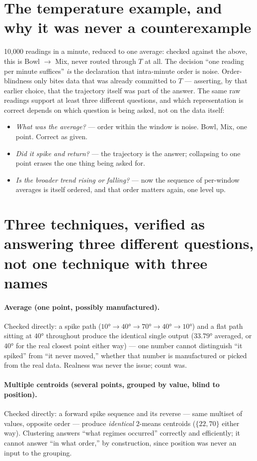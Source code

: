 \documentclass[11pt]{article}
\begin{document}
\section{The temperature example, and why it was never a
counterexample}

10,000 readings in a minute, reduced to one average: checked against
the above, this is Bowl $\to$ Mix, never routed through $T$ at all.
The decision ``one reading per minute suffices'' \emph{is} the
declaration that intra-minute order is noise. Order-blindness only
bites data that was already committed to $T$ --- asserting, by that
earlier choice, that the trajectory itself was part of the answer.
The same raw readings support at least three different questions,
and which representation is correct depends on which question is
being asked, not on the data itself:
\begin{itemize}
\item \emph{What was the average?} --- order within the window is
noise. Bowl, Mix, one point. Correct as given.
\item \emph{Did it spike and return?} --- the trajectory is the
answer; collapsing to one point erases the one thing being asked
for.
\item \emph{Is the broader trend rising or falling?} --- now the
sequence of per-window averages is itself ordered, and that order
matters again, one level up.
\end{itemize}

\section{Three techniques, verified as answering three different
questions, not one technique with three names}

\paragraph{Average (one point, possibly manufactured).} Checked
directly: a spike path ($10°\!\to\!40°\!\to\!70°\!\to\!40°\!\to\!10°$)
and a flat path sitting at $40°$ throughout produce the identical
single output ($33.79°$ averaged, or $40°$ for the real closest
point either way) --- one number cannot distinguish ``it spiked''
from ``it never moved,'' whether that number is manufactured or
picked from the real data. Realness was never the issue; count was.

\paragraph{Multiple centroids (several points, grouped by value,
blind to position).} Checked directly: a forward spike sequence and
its reverse --- same multiset of values, opposite order --- produce
\emph{identical} $2$-means centroids ($\{22,70\}$ either way).
Clustering answers ``what regimes occurred'' correctly and
efficiently; it cannot answer ``in what order,'' by construction,
since position was never an input to the grouping.
\end{document}
